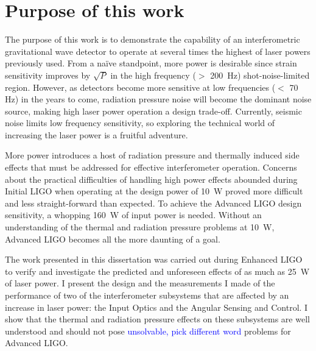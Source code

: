 \chapter{Purpose of this work}
The purpose of this work is to demonstrate the capability of an
interferometric gravitational wave detector to operate at several
times the highest of laser powers previously used. From a na\"ive
standpoint, more power is desirable since strain sensitivity improves
by $\sqrt{P}$ in the high frequency ($>$ 200~Hz) shot-noise-limited
region. However, as detectors become more sensitive at low frequencies
($<$ 70 Hz) in the years to come, radiation pressure noise will become
the dominant noise source, making high laser power operation a design
trade-off. Currently, seismic noise limits low frequency sensitivity,
so exploring the technical world of increasing the laser power is a
fruitful adventure.

More power introduces a host of radiation pressure and thermally
induced side effects that must be addressed for effective
interferometer operation. Concerns about the practical difficulties of
handling high power effects abounded during Initial LIGO when
operating at the design power of 10~W proved more difficult and less
straight-forward than expected. To achieve the Advanced LIGO design
sensitivity, a whopping 160~W of input power is needed. Without an
understanding of the thermal and radiation pressure problems at 10~W,
Advanced LIGO becomes all the more daunting of a goal. 

The work presented in this dissertation was carried out during
Enhanced LIGO to verify and investigate the predicted and unforeseen
effects of as much as 25~W of laser power. I present the design and
the measurements I made of the performance of two of the
interferometer subsystems that are affected by an increase in laser
power: the Input Optics and the Angular Sensing and Control. I show
that the thermal and radiation pressure effects on these subsystems
are well understood and should not pose \textcolor{blue}{unsolvable,
  pick different word} problems for
Advanced LIGO.


